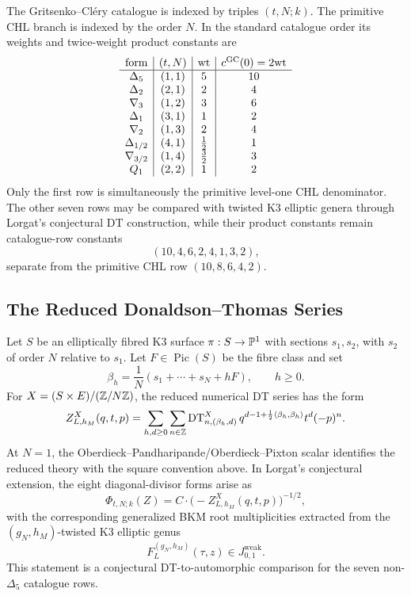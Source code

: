 The Gritsenko--Cl\'ery catalogue is indexed by triples \((t,N;k)\).
The primitive CHL branch is indexed by the order \(N\).  In the
standard catalogue order its weights and twice-weight product constants are
\[
\begin{array}{c|c|c|c}
\text{form} & (t,N) & \mathrm{wt} & c^{\mathrm{GC}}(0)=2\mathrm{wt}\\
\hline
\Delta_5 & (1,1) & 5 & 10\\
\Delta_2 & (2,1) & 2 & 4\\
\nabla_3 & (1,2) & 3 & 6\\
\Delta_1 & (3,1) & 1 & 2\\
\nabla_2 & (1,3) & 2 & 4\\
\Delta_{1/2} & (4,1) & \tfrac12 & 1\\
\nabla_{3/2} & (1,4) & \tfrac32 & 3\\
Q_1 & (2,2) & 1 & 2
\end{array}
\]
Only the first row is simultaneously the primitive level-one CHL
denominator.  The other seven rows may be compared with twisted K3
elliptic genera through Lorgat's conjectural DT construction, while
their product constants remain catalogue-row constants
\[
        (10,4,6,2,4,1,3,2),
\]
separate from the primitive CHL row \((10,8,6,4,2)\).

\subsection*{The Reduced Donaldson--Thomas Series}
\label{sec:frontier-dt-series}

Let \(S\) be an elliptically fibred K3 surface
\(\pi:S\to\mathbb{P}^1\) with sections \(s_1,s_2\), with \(s_2\) of order
\(N\) relative to \(s_1\).  Let \(F\in\operatorname{Pic}(S)\) be the
fibre class and set
\[
        \beta_h=\frac{1}{N}(s_1+\cdots+s_N+hF),\qquad h\geq 0 .
\]
For \(X=(S\times E)/(\mathbb{Z}/N\mathbb{Z})\), the reduced numerical DT series has
the form
\[
Z^X_{L,h_M}(q,t,p)=
\sum_{h,d\geq0}\sum_{n\in\mathbb{Z}}
\mathrm{DT}^X_{n,(\beta_h,d)}\,
q^{d-1+\frac12\langle\beta_h,\beta_h\rangle}
t^d(-p)^n .
\]
At \(N=1\), the Oberdieck--Pandharipande/Oberdieck--Pixton scalar
identifies the reduced theory with the square convention above.  In
Lorgat's conjectural extension, the eight diagonal-divisor forms arise
as
\[
        \Phi_{t,N;k}(Z)=C\cdot\bigl(-Z^X_{L,h_M}(q,t,p)\bigr)^{-1/2},
\]
with the corresponding generalized BKM root multiplicities extracted
from the \((g_N,h_M)\)-twisted K3 elliptic genus
\[
        F^{(g_N,h_M)}_L(\tau,z)\in J^{\mathrm{weak}}_{0,1}.
\]
This statement is a conjectural DT-to-automorphic comparison for the
seven non-\(\Delta_5\) catalogue rows.

